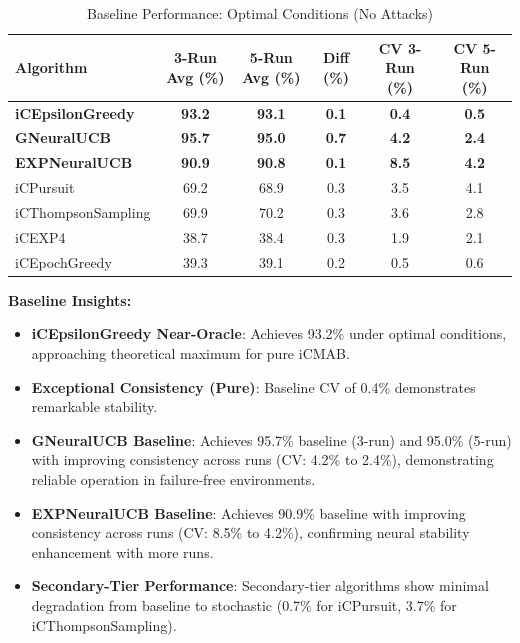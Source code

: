 \documentclass[12pt,a4paper]{article}
\newcommand{\primarytext}[1]{\textcolor{primaryblue}{\textbf{#1}}}
\newcommand{\secondarytext}[1]{\textcolor{secondaryblue}{\textbf{#1}}}
\newcommand{\legacy}[1]{\textcolor{legacycolor}{\textbf{#1}}}
\newcommand{\neural}[1]{\textcolor{neuralcolor}{\textbf{#1}}}
\begin{document}
\begin{table}[H]
\centering
\caption{Baseline Performance: Optimal Conditions (No Attacks)}
\label{tab:baseline-performance}
\begin{tabular}{@{}lccccc@{}}
\toprule
\textbf{Algorithm} & \textbf{3-Run Avg (\%)} & \textbf{5-Run Avg (\%)} & \textbf{Diff (\%)} & \textbf{CV 3-Run (\%)} & \textbf{CV 5-Run (\%)} \\
\midrule
\primarytext{iCEpsilonGreedy}   & \primarytext{93.2} & \primarytext{93.1} & \primarytext{0.1} & \primarytext{0.4} & \primarytext{0.5} \\
\neural{GNeuralUCB}            & \neural{95.7} & \neural{95.0} & \neural{0.7} & \neural{4.2} & \neural{2.4} \\
\legacy{EXPNeuralUCB}           & \legacy{90.9} & \legacy{90.8} & \legacy{0.1} & \legacy{8.5} & \legacy{4.2} \\
iCPursuit                       & 69.2 & 68.9 & 0.3 & 3.5 & 4.1 \\
iCThompsonSampling              & 69.9 & 70.2 & 0.3 & 3.6 & 2.8 \\
iCEXP4                          & 38.7 & 38.4 & 0.3 & 1.9 & 2.1 \\
iCEpochGreedy                   & 39.3 & 39.1 & 0.2 & 0.5 & 0.6 \\
\bottomrule
\end{tabular}
\end{table}

\textbf{Baseline Insights:}
\begin{itemize}
\item \primarytext{iCEpsilonGreedy Near-Oracle}: Achieves 93.2\% under optimal conditions, approaching theoretical maximum for pure iCMAB.
\item \primarytext{Exceptional Consistency (Pure)}: Baseline CV of 0.4\% demonstrates remarkable stability.
\item \neural{GNeuralUCB Baseline}: Achieves 95.7\% baseline (3-run) and 95.0\% (5-run) with improving consistency across runs (CV: 4.2\% to 2.4\%), demonstrating reliable operation in failure-free environments.
\item \legacy{EXPNeuralUCB Baseline}: Achieves 90.9\% baseline with improving consistency across runs (CV: 8.5\% to 4.2\%), confirming neural stability enhancement with more runs.
\item \secondarytext{Secondary-Tier Performance}: Secondary-tier algorithms show minimal degradation from baseline to stochastic (0.7\% for iCPursuit, 3.7\% for iCThompsonSampling).
\end{itemize}
\end{document}

